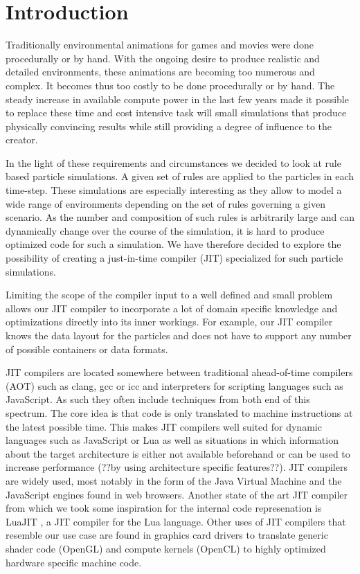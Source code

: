 \section{Introduction}\label{sec:intro}

Traditionally environmental animations for games and movies were done procedurally or by hand. 
With the ongoing desire to produce realistic and detailed environments, these animations are becoming too numerous and complex.
It becomes thus too costly to be done procedurally or by hand. 
The steady increase in available compute power in the last few years made it possible to replace these time and cost intensive task will small simulations that produce physically convincing results while still providing a degree of influence to the creator.

In the light of these requirements and circumstances we decided to look at rule based particle simulations.
A given set of rules are applied to the particles in each time-step.
These simulations are especially interesting as they allow to model a wide range of environments depending on the set of rules governing a given scenario. 
As the number and composition of such rules is arbitrarily large and can dynamically change over the course of the simulation, it is hard to produce optimized code for such a simulation. We have therefore decided to explore the possibility of creating a just-in-time compiler (JIT) specialized for such particle simulations.

Limiting the scope of the compiler input to a well defined and small problem allows our JIT compiler to incorporate a lot of domain specific knowledge and optimizations directly into its inner workings. For example, our JIT compiler knows the data layout for the particles and does not have to support any number of possible containers or data formats.

JIT compilers are located somewhere between traditional ahead-of-time compilers (AOT) such as clang\cite{clang}, gcc\cite{gcc} or icc\cite{icc} and interpreters for scripting languages such as JavaScript. As such they often include techniques from both end of this spectrum. The core idea is that code is only translated to machine instructions at the latest possible time. This makes JIT compilers well suited for dynamic languages such as JavaScript or Lua as well as situations in which information about the target architecture is either not available beforehand or can be used to increase performance (??by using architecture specific features??). JIT compilers are widely used, most notably in the form of the Java Virtual Machine\cite{jvm} and the JavaScript\cite{v8}\cite{SpiderMonkey} engines found in web browsers. Another state of the art JIT compiler from which we took some inspiration for the internal code represenation is LuaJIT \cite{LuaJIT}\cite{LuaJITir}, a JIT compiler for the Lua language. Other uses of JIT compilers that resemble our use case are found in graphics card drivers to translate generic shader code (OpenGL) and compute kernels (OpenCL) to highly optimized hardware specific machine code.


